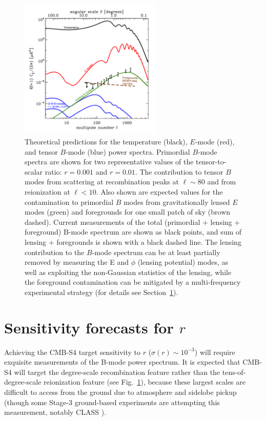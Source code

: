 \begin{figure}[h]
\begin{center}
\includegraphics[width=0.6\textwidth]{Inflation/cmb_powspec_for_s4scibook_with_data_uk2.pdf}
\end{center}
\caption{Theoretical predictions for the temperature (black), 
$E$-mode (red), and tensor $B$-mode (blue) power spectra. Primordial 
$B$-mode spectra are shown for two representative values of the tensor-to-scalar
ratio: $r=0.001$ and $r=0.01.$ 
The contribution to tensor $B$ modes from scattering at recombination peaks at $\ell \sim 80$
and from reionization at $\ell < 10$.
Also shown are expected values for the contamination
to primordial $B$ modes from gravitationally lensed $E$ modes (green) and foregrounds
for one small patch of sky (brown dashed). Current measurements of the total (primordial +
lensing + foreground) B-mode spectrum are shown as black points, and sum of lensing + foregrounds
is shown with a black dashed line.
The lensing contribution
to the $B$-mode spectrum can be at least partially removed by measuring the 
E and $\phi$ (lensing potential) modes, as well as exploiting the non-Gaussian statistics of the lensing, while the foreground contamination
can be mitigated by a multi-frequency experimental strategy (for details see Section~\ref{sec:needs}).
}
\label{fig:clall}
\end{figure}

\section{Sensitivity forecasts for $r$}
\label{sec:needs}

Achieving the CMB-S4 target sensitivity to $r$ ($\sigma(r) \sim 10^{-3}$) will require exquisite measurements of the B-mode power spectrum. 
It is expected that CMB-S4 will target the degree-scale recombination feature rather than the tens-of-degree-scale reionization feature (see Fig.~\ref{fig:clall}), because these largest scales are difficult to access from the ground due to atmosphere and sidelobe pickup (though some Stage-3 ground-based experiments are attempting this measurement, notably CLASS \cite{Essinger-Hileman:2014pja}).


